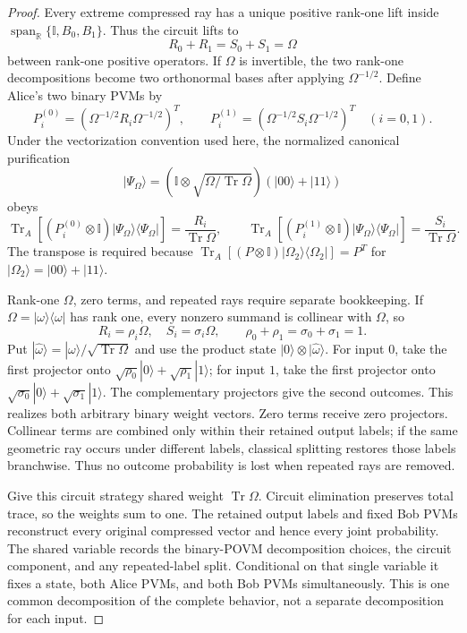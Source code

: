 \documentclass[11pt]{article}
\theoremstyle{definition}
\newcommand{\Tr}{\operatorname{Tr}}
\newcommand{\id}{\mathbb I}
\newcommand{\R}{\mathbb R}
\begin{document}
\begin{proof}
Every extreme compressed ray has a unique positive rank-one lift inside
\(\operatorname{span}_{\R}\{\id,B_0,B_1\}\). Thus the circuit lifts to
\[
R_0+R_1=S_0+S_1=\Omega
\]
between rank-one positive operators. If \(\Omega\) is invertible, the two
rank-one decompositions become two orthonormal bases after applying
\(\Omega^{-1/2}\). Define Alice's two binary PVMs by
\[
P_i^{(0)}=
\left(\Omega^{-1/2}R_i\Omega^{-1/2}\right)^T,\qquad
P_i^{(1)}=
\left(\Omega^{-1/2}S_i\Omega^{-1/2}\right)^T
\quad(i=0,1).
\]
Under the vectorization convention used here, the normalized canonical
purification
\[
|\Psi_\Omega\rangle=
(\id\otimes\sqrt{\Omega/\Tr\Omega})(|00\rangle+|11\rangle)
\]
obeys
\[
\Tr_A\!\left[(P_i^{(0)}\otimes\id)
|\Psi_\Omega\rangle\langle\Psi_\Omega|\right]
=\frac{R_i}{\Tr\Omega},\qquad
\Tr_A\!\left[(P_i^{(1)}\otimes\id)
|\Psi_\Omega\rangle\langle\Psi_\Omega|\right]
=\frac{S_i}{\Tr\Omega}.
\]
The transpose is required because
\(\Tr_A[(P\otimes\id)|\Omega_2\rangle\langle\Omega_2|]=P^T\) for
\(|\Omega_2\rangle=|00\rangle+|11\rangle\).

Rank-one \(\Omega\), zero terms, and repeated rays require separate
bookkeeping. If
\(\Omega=|\omega\rangle\langle\omega|\) has rank one, every nonzero summand
is collinear with \(\Omega\), so
\[
R_i=\rho_i\Omega,\quad S_i=\sigma_i\Omega,\qquad
\rho_0+\rho_1=\sigma_0+\sigma_1=1.
\]
Put \(|\widehat\omega\rangle=|\omega\rangle/\sqrt{\Tr\Omega}\) and use the
product state \(|0\rangle\otimes|\widehat\omega\rangle\). For input \(0\),
take the first projector onto
\(\sqrt{\rho_0}|0\rangle+\sqrt{\rho_1}|1\rangle\); for input \(1\), take the
first projector onto
\(\sqrt{\sigma_0}|0\rangle+\sqrt{\sigma_1}|1\rangle\). The complementary
projectors give the second outcomes. This realizes both arbitrary binary
weight vectors. Zero terms
receive zero projectors. Collinear terms are combined only within their
retained output labels; if the same geometric ray occurs under different
labels, classical splitting restores those labels branchwise. Thus no
outcome probability is lost when repeated rays are removed.

Give this circuit strategy shared weight \(\Tr\Omega\). Circuit elimination
preserves total trace, so the weights sum to one. The retained output labels
and fixed Bob PVMs reconstruct every original compressed vector and hence
every joint probability. The shared variable records the binary-POVM
decomposition choices, the circuit component, and any repeated-label split.
Conditional on that single variable it fixes a state, both Alice PVMs, and
both Bob PVMs simultaneously. This is one common decomposition of the
complete behavior, not a separate decomposition for each input.
\end{proof}
\end{document}
